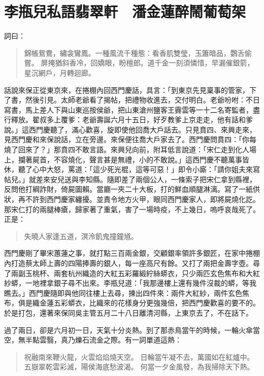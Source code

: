 
\chapter{李瓶兒私語翡翠軒　潘金蓮醉鬧葡萄架}

詞曰：
\begin{quote}
錦帳鴛鴦，繡衾鸞鳳。一種風流千種態：看香肌雙瑩，玉簫暗品，鸚舌偷嘗。
屏掩猶斜香冷，回嬌眼，盼檀郎。道千金一刻須憐惜，早漏催銀箭，星沉網戶，月轉迴廊。
\end{quote}

話說來保正從東京來，在捲棚內回西門慶話，具言：「到東京先見稟事的管家，下了書，然後引見。太師老爺看了揭帖，把禮物收進去，交付明白。老爺吩咐：不日寫書，馬上差人下與山東巡按侯爺，把山東滄州鹽客王霽雲等一十二名寄監者，盡行釋放。翟叔多上覆爹：老爺壽誕六月十五日，好歹教爹上京走走，他有話和爹說。」這西門慶聽了，滿心歡喜，旋即使他回喬大戶話去。只見賁四、來興走來，見西門慶和來保說話，立在旁邊。來保便往喬大戶家去了。西門慶問賁四：「你每燒了回來了？」那賁四不敢言語。來興兒向前，附耳低言說道：「宋仁走到化人場上，攔著屍首，不容燒化，聲言甚是無禮，小的不敢說。」這西門慶不聽萬事皆休，聽了心中大怒，罵道：「這少死光棍，這等可惡！」即令小廝：「請你姐夫來寫帖兒。」就差來安兒送與李知縣。隨即差了兩個公人，一條索子把宋仁拿到縣裡，反問他打綱詐財，倚屍圖賴。當廳一夾二十大板，打的鮮血順腿淋漓。寫了一紙供狀，再不許到西門慶家纏擾。並責令地方火甲，眼同西門慶家人，即將屍燒化訖。那宋仁打的兩腿棒瘡，歸家著了重氣，害了一場時疫，不上幾日，嗚呼哀哉死了。正是：
\begin{quote}
失曉人家逢五道，溟泠飢鬼撞鐘馗。
\end{quote}

西門慶剛了畢宋蕙蓮之事，就打點三百兩金銀，交顧銀率領許多銀匠，在家中捲棚內打造蔡太師上壽的四陽捧壽的銀人，每一座高尺有餘。又打了兩把金壽字壺。尋了兩副玉桃杯、兩套杭州織造的大紅五彩羅緞紵絲蟒衣，只少兩匹玄色焦布和大紅紗蟒，一地裡拿銀子尋不出來。李瓶兒道：「我那邊樓上還有幾件沒裁的蟒，等我瞧去。」西門慶隨即與他同往樓上去尋，揀出四件來：兩件大紅紗，兩件玄色焦布，俱是織金蓮五彩蟒衣，比織來的花樣身分更強幾倍，把西門慶歡喜的要不的。於是打包，還著來保同吳主管五月二十八日離清河縣，上東京去了，不在話下。

過了兩日，卻是六月初一日，天氣十分炎熱。到了那赤鳥當午的時候，一輪火傘當空，無半點雲翳，真乃爍石流金之際。有一詞單道這熱：
\begin{quote}
祝融南來鞭火龍，火雲焰焰燒天空。
日輪當午凝不去，萬國如在紅爐中。
五嶽翠乾雲彩滅，陽侯海底愁波渴。
何當一夕金風發，為我掃除天下熱。
\end{quote}

